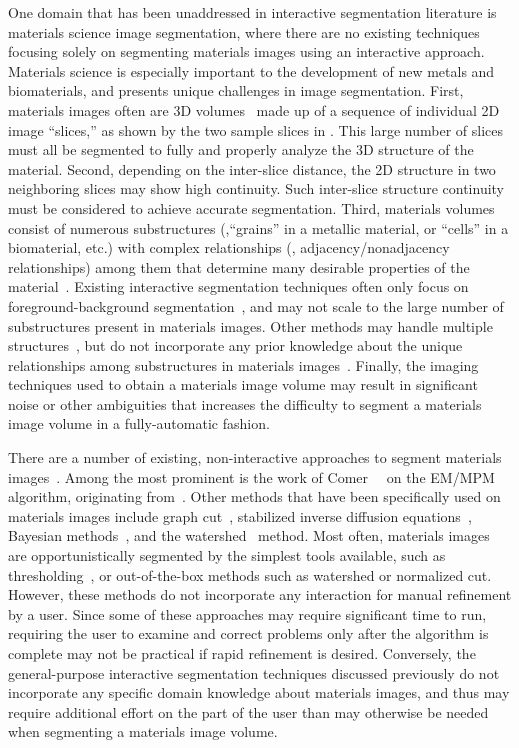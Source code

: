 \documentclass[]{spie}  %
\begin{document}
One domain that has been unaddressed in interactive segmentation
literature is materials science image segmentation, where there are no
existing techniques focusing solely on segmenting materials images
using an interactive approach.  Materials science is especially
important to the development of new metals and biomaterials, and
presents unique challenges in image segmentation.  First, materials
images often are 3D volumes~\cite{ibrahim:91} made up of a sequence of
individual 2D image ``slices,'' as shown by the two sample slices in
.  This large number of slices must all be segmented to
fully and properly analyze the 3D structure of the material.  Second,
depending on the inter-slice distance, the 2D structure in two
neighboring slices may show high continuity.  Such inter-slice
structure continuity must be considered to achieve accurate
segmentation.  Third, materials volumes consist of numerous
substructures (\eg,``grains'' in a metallic material, or ``cells'' in
a biomaterial, etc.) with complex relationships (\eg,
adjacency/nonadjacency relationships) among them that determine many
desirable properties of the material~\cite{swiler:95, rollett:04}.
Existing interactive segmentation techniques often only focus on
foreground-background segmentation~\cite{rother:04, boykov:01b}, and
may not scale to the large number of substructures present in
materials images.  Other methods may handle multiple
structures~\cite{straehle:11, straehle:12}, but do not incorporate any
prior knowledge about the unique relationships among substructures in
materials images~\cite{reed:06, tan:04}.  Finally, the imaging
techniques used to obtain a materials image volume may result in
significant noise or other ambiguities that increases the difficulty
to segment a materials image volume in a fully-automatic fashion.

There are a number of existing, non-interactive approaches to segment
materials images~\cite{chuang:08, simmons:09}.  Among the most
prominent is the work of Comer~\etal~\cite{comer:94, comer:00} on the
EM/MPM algorithm, originating from~\cite{marroquin:87}.  Other methods
that have been specifically used on materials images include graph
cut~\cite{landis:11, waggoner:11}, stabilized inverse diffusion
equations~\cite{huffman:08}, Bayesian methods~\cite{comer:11,
  simmons:08}, and the watershed~\cite{liq:07} method.  Most often,
materials images are opportunistically segmented by the simplest tools
available, such as thresholding~\cite{gonzalez:08,shapiro:01}, or
out-of-the-box methods such as watershed or normalized cut.  However,
these methods do not incorporate any interaction for manual refinement
by a user.  Since some of these approaches may require significant
time to run, requiring the user to examine and correct problems only
after the algorithm is complete may not be practical if rapid
refinement is desired.  Conversely, the general-purpose interactive
segmentation techniques discussed previously do not incorporate any
specific domain knowledge about materials images, and thus may require
additional effort on the part of the user than may otherwise be needed
when segmenting a materials image volume.
\end{document}
